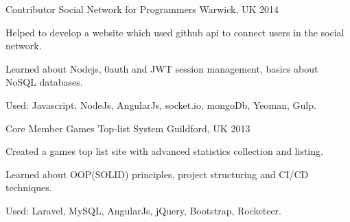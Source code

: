 

\begin{cventries}


  \cventry
    {Contributor} %
    {Social Network for Programmers} %
    {Warwick, UK} %
    {2014} %
    {
      \begin{cvitems} %
        \item {Helped to develop a website which used github api to connect users in the social network.}
        \item {Learned about Nodejs, 0auth and JWT session management, basics about NoSQL databases.}
        \item {Used: Javascript, NodeJs, AngularJs, socket.io, mongoDb, Yeoman, Gulp.}
      \end{cvitems}
    }

  \cventry
    {Core Member} %
    {Games Top-list System} %
    {Guildford, UK} %
    {2013} %
    {
      \begin{cvitems} %
        \item {Created a games top list site with advanced statistics collection and listing.}
        \item {Learned about OOP(SOLID) principles, project structuring and CI/CD techniques.}
        \item {Used: Laravel, MySQL, AngularJs, jQuery, Bootstrap, Rocketeer.}
      \end{cvitems}
    }


\end{cventries}
